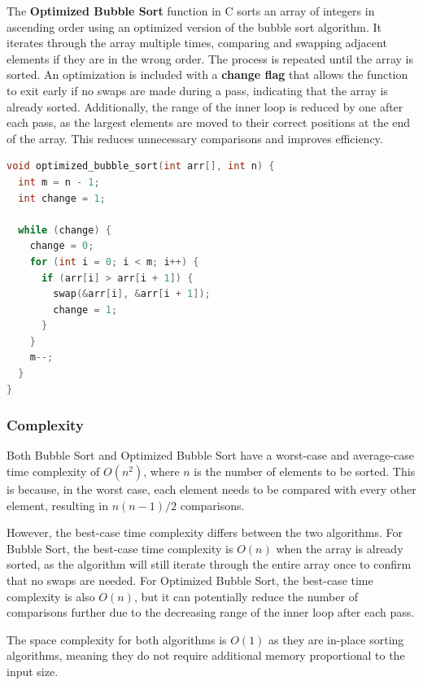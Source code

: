\documentclass{article}
\begin{document}
The \textbf{Optimized Bubble Sort} function in C sorts an array of integers in ascending order using an optimized version of the bubble sort algorithm. It iterates through the array multiple times, comparing and swapping adjacent elements if they are in the wrong order. The process is repeated until the array is sorted. An optimization is included with a \textbf{change flag} that allows the function to exit early if no swaps are made during a pass, indicating that the array is already sorted. Additionally, the range of the inner loop is reduced by one after each pass, as the largest elements are moved to their correct positions at the end of the array. This reduces unnecessary comparisons and improves efficiency.

\begin{lstlisting}[language=C, caption=Optimized Bubble Sort implementation]
void optimized_bubble_sort(int arr[], int n) {
  int m = n - 1;
  int change = 1;

  while (change) {
    change = 0;
    for (int i = 0; i < m; i++) {
      if (arr[i] > arr[i + 1]) {
        swap(&arr[i], &arr[i + 1]);
        change = 1;
      }
    }
    m--;
  }
}
\end{lstlisting}

\newpage
\subsubsection{Complexity}
Both Bubble Sort and Optimized Bubble Sort have a worst-case and average-case time complexity of $O(n^2)$, where $n$ is the number of elements to be sorted. This is because, in the worst case, each element needs to be compared with every other element, resulting in $n(n-1)/2$ comparisons.

However, the best-case time complexity differs between the two algorithms. For Bubble Sort, the best-case time complexity is $O(n)$ when the array is already sorted, as the algorithm will still iterate through the entire array once to confirm that no swaps are needed. For Optimized Bubble Sort, the best-case time complexity is also $O(n)$, but it can potentially reduce the number of comparisons further due to the decreasing range of the inner loop after each pass.

The space complexity for both algorithms is $O(1)$ as they are in-place sorting algorithms, meaning they do not require additional memory proportional to the input size.
\end{document}
